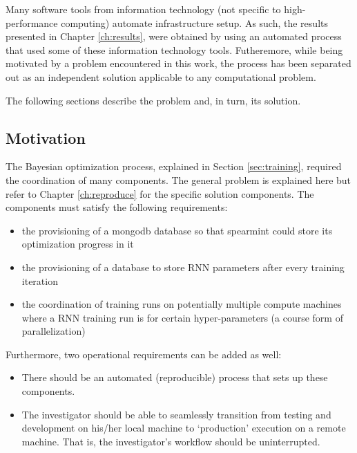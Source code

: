 Many software tools from information technology (not specific to high-performance computing) automate infrastructure setup.
%
As such, the results presented in Chapter \ref{ch:results}, were obtained by using an automated process that used some of these information technology tools.
%
Futheremore, while being motivated by a problem encountered in this work, the process has been separated out as an independent solution applicable to any computational problem.


The following sections describe the problem and, in turn, its solution.


\subsection{Motivation}

The Bayesian optimization process, explained in Section \ref{sec:training}, required the coordination of many components.
%
The general problem is explained here but refer to Chapter \ref{ch:reproduce} for the specific solution components.
%
The components must satisfy the following requirements:
%
\begin{itemize}

\item 
  the provisioning of a \textsf{mongodb} database so that \textsf{spearmint} could store its optimization progress in it

\item
  the provisioning of a database to store RNN parameters after every training iteration

\item
  the coordination of training runs on potentially multiple compute machines where a RNN training run is for certain hyper-parameters (a course form of parallelization)

\end{itemize}

Furthermore, two operational requirements can be added as well:

\begin{itemize}

\item
  There should be an automated (reproducible) process that sets up these components.

\item
  The investigator should be able to seamlessly transition from testing and development on his/her local machine to `production' execution on a remote machine.
%
That is, the investigator's workflow should be uninterrupted.

\end{itemize}


